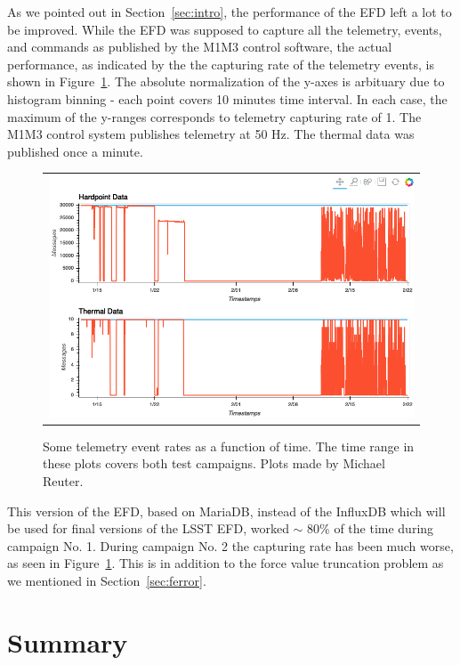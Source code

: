 \documentclass [twoside,openbib,12pt]{article}
\begin{document}
As we pointed out in Section~\ref{sec:intro}, the performance of the
EFD left a lot to be improved.
While the EFD was
supposed to capture all the telemetry, events, and commands as
published by the M1M3 control software,
the actual performance, as indicated by the the capturing rate of the
telemetry events, is shown in Figure~\ref{fig:efd}.
The absolute normalization of the y-axes is arbituary due to histogram
binning - each point covers 10 minutes time interval.
In each case, the maximum of the y-ranges corresponds to telemetry
capturing rate of 1.
The M1M3 control system publishes telemetry at 50 Hz.
The thermal data was published once a minute.

 \begin{figure}[bthp]
   \begin{center}
     \begin{tabular}{c}
\includegraphics[width=170mm]{figures/EFD_messages_both_campaigns.png}
  \end{tabular}
   \end{center}
   \caption
   { \label{fig:efd}
Some telemetry event rates as a function of time. The time range in
these plots covers both test campaigns. Plots made by Michael Reuter.
 }
\end{figure}


This version of the EFD, based on MariaDB, instead of the InfluxDB
which will be used for final versions of the LSST EFD, worked $\sim$
80\% of the time during campaign No. 1.
During campaign No. 2 the capturing rate has been much worse, as seen
in Figure~\ref{fig:efd}.
This is in addition to the force value truncation problem as we
mentioned in Section~\ref{sec:ferror}.


\section{Summary}
\end{document}
